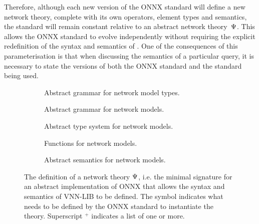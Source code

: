 Therefore, although each new version of the ONNX standard will define a new network theory, complete with its own operators, element types and semantics, the \vnnlib{} standard will remain constant relative to an abstract network theory~$\Psi$.
This allows the ONNX standard to evolve independently without requiring the explicit redefinition of the syntax and semantics of \vnnlib{}. 
One of the consequences of this parameterisation is that when discussing the semantics of a particular \vnnlib{} query, it is necessary to state the versions of both the ONNX standard and the \vnnlib{} standard being used.


\begin{figure}
	\setlength{\grammarparsep}{0pt}

	\begin{subfigure}[t]{0.63\textwidth}
		
		\caption{Abstract grammar for network model types.}
		\label{fig:onnx-type-syntax}
	\end{subfigure}
	\begin{subfigure}[t]{0.36\textwidth}
		
		\caption{Abstract grammar for network models.}
		\label{fig:onnx-expr-syntax}
	\end{subfigure}
	\begin{subfigure}[t]{\textwidth}
		
		\caption{Abstract type system for network models.}
		\label{fig:onnx-types}
	\end{subfigure}
	\begin{subfigure}[t]{\textwidth}
		\vspace{-1em}
		
		\vspace{-2em}
		\caption{Functions for network models.}
		\label{fig:onnx-func-syntax}
	\end{subfigure}
	\begin{subfigure}[t]{\textwidth}
		
		\caption{Abstract semantics for network models.}
		\label{fig:onnx-semantics}
	\end{subfigure}
	\caption{The definition of a network theory $\Psi$, i.e. the minimal signature for an abstract implementation of ONNX that allows the syntax and semantics of VNN-LIB to be defined. The \missing{} symbol indicates what needs to be defined by the ONNX standard to instantiate the theory. Superscript $^+$ indicates a list of one or more.}
	\label{fig:onnx-signature}
\end{figure}


